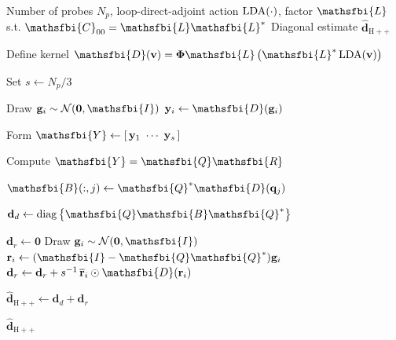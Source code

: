 \begin{algorithm}[H]
  \caption{Stochastic stepping diagonal estimator for
           \(\mathrm{diag}\left\{\mathsfbi{C}(T)\right\}\)}
  \label{alg:stochastic_stepping_diagonal_estimator}

  \begin{algorithmic}[1]
    \Require Number of probes \(N_p\), loop-direct-adjoint action \(\operatorname{LDA}(\cdot)\),
             factor \(\mathsfbi{L}\) s.t. \(\mathsfbi{C}_{00}=\mathsfbi{L}\mathsfbi{L}^{*}\)
    \Ensure Diagonal estimate \(\widehat{\mathbf{d}}_{\mathrm{H++}}\)

    \State Define kernel
      \(\mathsfbi{D}(\mathbf{v})=\boldsymbol{\Phi}\mathsfbi{L}
      \left(\mathsfbi{L}^{*}\LDA(\mathbf{v})\right)\)

    \State Set \(s\gets N_p/3\)

      \State Draw \(\mathbf{g}_i\sim\mathcal{N}(\mathbf{0},\mathsfbi{I})\)
      \State \(\mathbf{y}_i\gets\mathsfbi{D}(\mathbf{g}_i)\)
    \EndFor

    \State Form \(\mathsfbi{Y}\gets[\,\mathbf{y}_1\ \cdots\ \mathbf{y}_s\,]\)

    \State Compute \(\mathsfbi{Y}=\mathsfbi{Q}\mathsfbi{R}\)

      \State \(\mathsfbi{B}(:,j)\gets\mathsfbi{Q}^{*}\mathsfbi{D}(\mathbf{q}_j)\)
    \EndFor

    \State \(\mathbf{d}_d\gets
      \mathrm{diag}\left\{\mathsfbi{Q}\mathsfbi{B}\mathsfbi{Q}^{*}\right\}\)

    \State \(\mathbf{d}_r\gets\mathbf{0}\)
      \State Draw \(\mathbf{g}_i\sim\mathcal{N}(\mathbf{0},\mathsfbi{I})\)
      \State \(\mathbf{r}_i\gets(\mathsfbi{I}-\mathsfbi{Q}\mathsfbi{Q}^{*})\mathbf{g}_i\)
      \State \(\mathbf{d}_r\gets\mathbf{d}_r+
        s^{-1}\,\overline{\mathbf{r}}_i\odot\mathsfbi{D}(\mathbf{r}_i)\)
    \EndFor

    \State \(\widehat{\mathbf{d}}_{\mathrm{H++}}\gets\mathbf{d}_d+\mathbf{d}_r\)

    \State \Return \(\widehat{\mathbf{d}}_{\mathrm{H++}}\)
  \end{algorithmic}
\end{algorithm}


